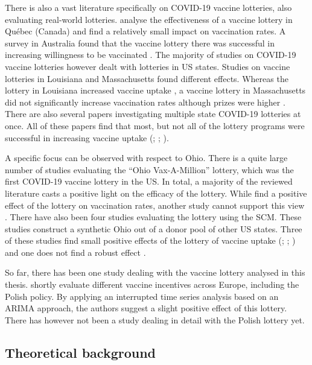 \documentclass{scrbook}
\begin{document}
There is also a vast literature specifically on COVID-19 vaccine
lotteries, also evaluating real-world lotteries.
\textcite{dube_exploring_2022} analyse the effectiveness of a vaccine
lottery in Québec (Canada) and find a relatively small impact on
vaccination rates. A survey in Australia found that the vaccine lottery
there was successful in increasing willingness to be vaccinated
\parencite{jun_association_2022}. The majority of studies on COVID-19
vaccine lotteries however dealt with lotteries in US states. Studies on
vaccine lotteries in Louisiana and Massachusetts found different
effects. Whereas the lottery in Louisiana increased vaccine uptake
\parencite{wang_moving_2023}, a vaccine lottery in Massachusetts did not
significantly increase vaccination rates although prizes were higher
\parencite{kim_did_2023}. There are also several papers investigating
multiple state COVID-19 lotteries at once. All of these papers find that
most, but not all of the lottery programs were successful in increasing
vaccine uptake (\cite{robertson_are_2021};
\cite{acharya_implementation_2021}; \cite{fuller_assessing_2022}).

A specific focus can be observed with respect to Ohio. There is a quite
large number of studies evaluating the ``Ohio Vax-A-Million'' lottery,
which was the first COVID-19 vaccine lottery in the US. In total, a
majority of the reviewed literature casts a positive light on the
efficacy of the lottery. While \textcite{mallow_covid-19_2022} find a
positive effect of the lottery on vaccination rates, another study
cannot support this view \parencite{walkey_lottery-based_2021}. There
have also been four studies evaluating the lottery using the SCM. These
studies construct a synthetic Ohio out of a donor pool of other US
states. Three of these studies find small positive effects of the
lottery of vaccine uptake (\cite{brehm_ohio_2022};
\cite{barber_conditional_2022}; \cite{sehgal_impact_2021}) and one does
not find a robust effect \parencite{lang_did_2022}.

So far, there has been one study dealing with the vaccine lottery
analysed in this thesis. \textcite{kuznetsova_effectiveness_2022}
shortly evaluate different vaccine incentives across Europe, including
the Polish policy. By applying an interrupted time series analysis based
on an ARIMA approach, the authors suggest a slight positive effect of
this lottery. There has however not been a study dealing in detail with
the Polish lottery yet.

\subsection{Theoretical background}
\end{document}
